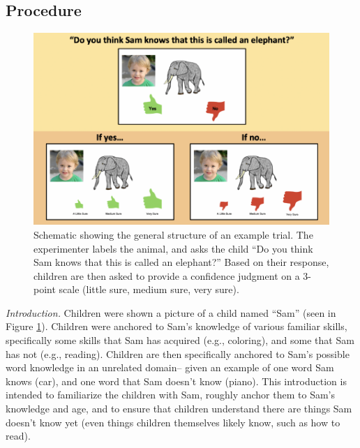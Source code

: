 \documentclass[10pt, letterpaper]{article}
\newenvironment{CodeChunk}{}{}
\begin{document}
\hypertarget{procedure}{%
\subsection{Procedure}\label{procedure}}

\begin{CodeChunk}
\begin{figure}[tb]

{\centering \includegraphics{figs/task-method-1} 

}

\caption[Schematic showing the general structure of an example trial]{Schematic showing the general structure of an example trial. The experimenter labels the animal, and asks the child “Do you think Sam knows that this is called an elephant?” Based on their response, children are then asked to provide a confidence judgment on a 3-point scale (little sure, medium sure, very sure).}\label{fig:task-method}
\end{figure}
\end{CodeChunk}

\emph{Introduction.} Children were shown a picture of a child named
``Sam'' (seen in Figure \ref{fig:task-method}). Children were anchored
to Sam's knowledge of various familiar skills, specifically some skills
that Sam has acquired (e.g., coloring), and some that Sam has not (e.g.,
reading). Children are then specifically anchored to Sam's possible word
knowledge in an unrelated domain-- given an example of one word Sam
knows (car), and one word that Sam doesn't know (piano). This
introduction is intended to familiarize the children with Sam, roughly
anchor them to Sam's knowledge and age, and to ensure that children
understand there are things Sam doesn't know yet (even things children
themselves likely know, such as how to read).
\end{document}
